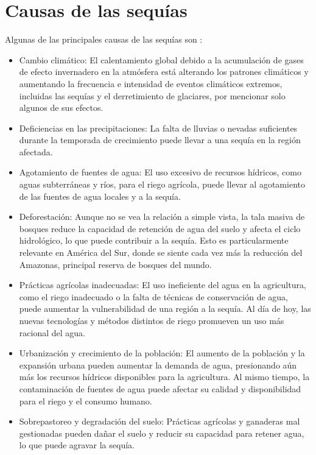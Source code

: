 \documentclass[12pt]{article}
\begin{document}
	\section{Causas de las sequías}
	Algunas de las principales causas de las sequías son :
    \begin{itemize}
		\item Cambio climático: El calentamiento global debido a la acumulación de gases de efecto invernadero en la atmósfera está alterando los patrones climáticos y aumentando la frecuencia e intensidad de eventos climáticos extremos, incluidas las sequías y el derretimiento de glaciares, por mencionar solo algunos de sus efectos.

		\item Deficiencias en las precipitaciones: La falta de lluvias o nevadas suficientes durante la temporada de crecimiento puede llevar a una sequía en la región afectada.

		\item Agotamiento de fuentes de agua: El uso excesivo de recursos hídricos, como aguas subterráneas y ríos, para el riego agrícola, puede llevar al agotamiento de las fuentes de agua locales y a la sequía.

		\item Deforestación: Aunque no se vea la relación a simple vista, la tala masiva de bosques reduce la capacidad de retención de agua del suelo y afecta el ciclo hidrológico, lo que puede contribuir a la sequía. Esto es particularmente relevante en América del Sur, donde se siente cada vez más la reducción del Amazonas, principal reserva de bosques del mundo.

		\item Prácticas agrícolas inadecuadas: El uso ineficiente del agua en la agricultura, como el riego inadecuado o la falta de técnicas de conservación de agua, puede aumentar la vulnerabilidad de una región a la sequía. Al día de hoy, las nuevas tecnologías y métodos distintos de riego promueven un uso más racional del agua.

		\item Urbanización y crecimiento de la población: El aumento de la población y la expansión urbana pueden aumentar la demanda de agua, presionando aún más los recursos hídricos disponibles para la agricultura. Al mismo tiempo, la contaminación de fuentes de agua puede afectar su calidad y disponibilidad para el riego y el consumo humano.

		\item Sobrepastoreo y degradación del suelo: Prácticas agrícolas y ganaderas mal gestionadas pueden dañar el suelo y reducir su capacidad para retener agua, lo que puede agravar la sequía.
	\end{itemize}
	
\end{document}

